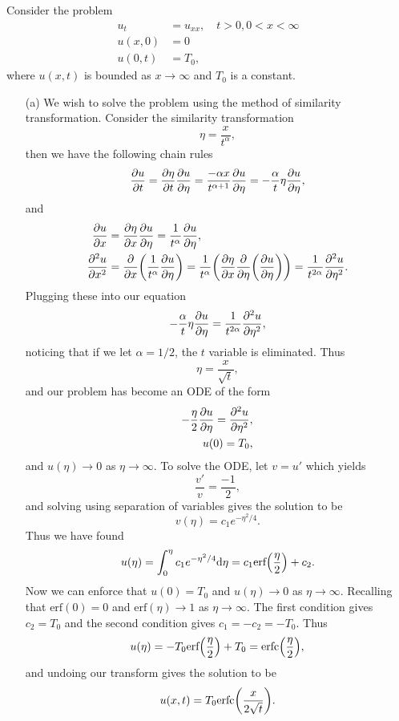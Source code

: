 \documentclass[12pt]{report}
\begin{document}
\begin{solution}

    \noindent
    Consider the problem
    \begin{align*}
        u_t &= u_{xx}, \quad t>0, 0 < x < \infty\\
        u(x,0) &= 0\\
        u(0,t) &= T_0, 
    \end{align*}
    where $u(x,t)$ is bounded as $x \to \infty$ and $T_0$ is a constant.

    \begin{enumerate}
        \item [(a)]
        We wish to solve the problem using the method of similarity transformation. Consider the similarity transformation
        \[
            \eta = \frac{x}{t^\alpha},
        \]    
        then we have the following chain rules 
        \[ 
            \frac{\partial u}{\partial t} = \frac{\partial \eta}{\partial t}\frac{\partial u}{\partial \eta} = \frac{-\alpha x}{t^{\alpha + 1}}\frac{\partial u}{\partial \eta} = - \frac{\alpha}{t}\eta \frac{\partial u}{\partial \eta},
        \]
        and
        \begin{align*}
            \frac{\partial u}{\partial x} &= \frac{\partial \eta}{\partial x}\frac{\partial u}{\partial \eta} = \frac{1}{t^\alpha}\frac{\partial u}{\partial \eta},\\
            \frac{\partial^{2} u}{\partial x^{2}} &= \frac{\partial }{\partial x}{\left(\frac{1}{t^\alpha}\frac{\partial u}{\partial \eta}\right)} = \frac{1}{t^\alpha} {\left(\frac{\partial \eta}{\partial x}\frac{\partial }{\partial \eta}{\left(\frac{\partial u}{\partial \eta}\right)}\right)} = \frac{1}{t^{2\alpha}}\frac{\partial^{2} u}{\partial \eta^{2}}.
        \end{align*} 
        Plugging these into our equation 
        \[
            - \frac{\alpha}{t}\eta \frac{\partial u}{\partial \eta} = \frac{1}{t^{2\alpha}}\frac{\partial^{2} u}{\partial \eta^{2}},
        \]
        noticing that if we let $\alpha = 1/2$, the $t$ variable is eliminated. Thus 
        \[
            \eta = \frac{x}{\sqrt{t}},
        \]
        and our problem has become an ODE of the form 
        \begin{align*}
            -\frac{\eta}{2} \frac{\partial u}{\partial \eta} = \frac{\partial^{2} u}{\partial \eta^{2}},\\
            u(0) = T_0,
        \end{align*} 
        and $u(\eta) \to 0$ as $\eta \to \infty$. To solve the ODE, let $v = u'$ which yields
        \[ 
            \frac{v'}{v} = \frac{-1}{2},
        \] 
        and solving using separation of variables gives the solution to be
        \[
            v(\eta) = c_1 e^{-\eta^2/4}.
        \]
        Thus we have found
        \[ 
            u(\eta) = \int_0^\eta c_1 e^{-\eta^2/4} {\mathrm{d}} \eta = c_1 \text{erf}{\left(\frac{\eta}{2}\right)} + c_2.
        \]
        Now we can enforce that $u(0) = T_0$ and $u(\eta) \to 0$ as $\eta \to \infty$. Recalling that $\text{erf}(0) = 0$ and $\text{erf}(\eta) \to 1$ as $\eta \to \infty$. The first condition gives $c_2 = T_0$ and the second condition gives $c_1 = -c_2 = -T_0$. Thus 
        \[
            u(\eta) =-T_0 \text{erf}{\left(\frac{\eta}{2}\right)} + T_0 = \text{erfc}{\left(\frac{\eta}{2}\right)},
        \]
        and undoing our transform gives the solution to be 
        \[
            u(x,t) = T_0 \text{erfc}{\left(\frac{x}{2\sqrt{t}}\right)}.
        \]



\end{enumerate}
\end{solution}
\end{document}
